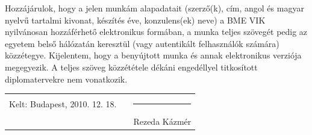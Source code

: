 Hozzájárulok, hogy a jelen munkám alapadatait (szerző(k), cím, angol és magyar
nyelvű tartalmi kivonat, készítés éve, konzulens(ek) neve) a BME VIK
nyilvánosan hozzáférhető elektronikus formában, a munka teljes szövegét pedig
az egyetem belső hálózatán keresztül (vagy autentikált felhasználók számára)
közzétegye. Kijelentem, hogy a benyújtott munka és annak elektronikus verziója
megegyezik. A teljes szöveg közzététele dékáni engedéllyel titkosított
diplomatervekre nem vonatkozik.


\vspace{5 cm}

\begin{tabular}[h]{c c c}

Kelt: Budapest, 2010. 12. 18. & \hspace{2cm} & \rule{5cm}{.4pt} \\

 & & Rezeda Kázmér

\end{tabular}

\clearpage

\setlength{\parindent}{0.2cm}
